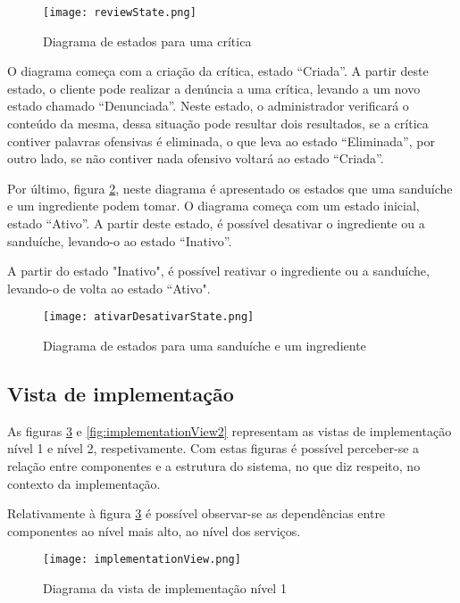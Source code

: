 \begin{figure}[H]
    \centering
    \texttt{[image: reviewState.png]}
    \caption{Diagrama de estados para uma crítica}
    \label{fig:reviewState}
\end{figure}

O diagrama começa com a criação da crítica, estado “Criada”. A partir deste estado, o cliente pode realizar a denúncia a uma crítica, levando a um novo estado chamado “Denunciada”. Neste estado, o administrador verificará o conteúdo da mesma, dessa situação pode resultar dois resultados, se a crítica contiver palavras ofensivas é eliminada, o que leva ao estado “Eliminada”, por outro lado, se não contiver nada ofensivo voltará ao estado “Criada”.

Por último, figura \ref{fig:alterarEstado}, neste diagrama é apresentado os estados que uma sanduíche e um ingrediente podem tomar. O diagrama começa com um estado inicial, estado “Ativo”. A partir deste estado, é possível desativar o ingrediente ou a sanduíche, levando-o ao estado “Inativo”.

A partir do estado "Inativo", é possível reativar o ingrediente ou a sanduíche, levando-o de volta ao estado “Ativo".

\begin{figure}[H]
    \centering
    \texttt{[image: ativarDesativarState.png]}
    \caption{Diagrama de estados para uma sanduíche e um ingrediente}
    \label{fig:alterarEstado}
\end{figure}

\subsection{Vista de implementação}

As figuras \ref{fig:implementationView1} e \ref{fig:implementationView2} representam as vistas de implementação nível 1 e nível 2, respetivamente. Com estas figuras é possível perceber-se a relação entre componentes e a estrutura do sistema, no que diz respeito, no contexto da implementação.

Relativamente à figura \ref{fig:implementationView1} é possível observar-se as dependências entre componentes ao nível mais alto, ao nível dos serviços.

\begin{figure}[H]
    \centering
    \texttt{[image: implementationView.png]}
    \caption{Diagrama da vista de implementação nível 1}
    \label{fig:implementationView1}
\end{figure}

